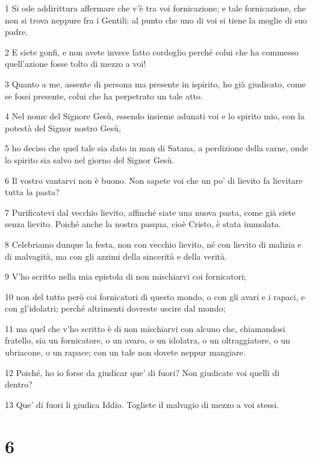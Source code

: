 \par 1 Si ode addirittura affermare che v'è tra voi fornicazione; e tale fornicazione, che non si trova neppure fra i Gentili; al punto che uno di voi si tiene la moglie di suo padre.
\par 2 E siete gonfi, e non avete invece fatto cordoglio perché colui che ha commesso quell'azione fosse tolto di mezzo a voi!
\par 3 Quanto a me, assente di persona ma presente in ispirito, ho già giudicato, come se fossi presente, colui che ha perpetrato un tale atto.
\par 4 Nel nome del Signore Gesù, essendo insieme adunati voi e lo spirito mio, con la potestà del Signor nostro Gesù,
\par 5 ho deciso che quel tale sia dato in man di Satana, a perdizione della carne, onde lo spirito sia salvo nel giorno del Signor Gesù.
\par 6 Il vostro vantarvi non è buono. Non sapete voi che un po' di lievito fa lievitare tutta la pasta?
\par 7 Purificatevi dal vecchio lievito, affinché siate una nuova pasta, come già siete senza lievito. Poiché anche la nostra pasqua, cioè Cristo, è stata immolata.
\par 8 Celebriamo dunque la festa, non con vecchio lievito, né con lievito di malizia e di malvagità, ma con gli azzimi della sincerità e della verità.
\par 9 V'ho scritto nella mia epistola di non mischiarvi coi fornicatori;
\par 10 non del tutto però coi fornicatori di questo mondo, o con gli avari e i rapaci, e con gl'idolatri; perché altrimenti dovreste uscire dal mondo;
\par 11 ma quel che v'ho scritto è di non mischiarvi con alcuno che, chiamandosi fratello, sia un fornicatore, o un avaro, o un idolatra, o un oltraggiatore, o un ubriacone, o un rapace; con un tale non dovete neppur mangiare.
\par 12 Poiché, ho io forse da giudicar que' di fuori? Non giudicate voi quelli di dentro?
\par 13 Que' di fuori li giudica Iddio. Togliete il malvagio di mezzo a voi stessi.

\chapter{6}

